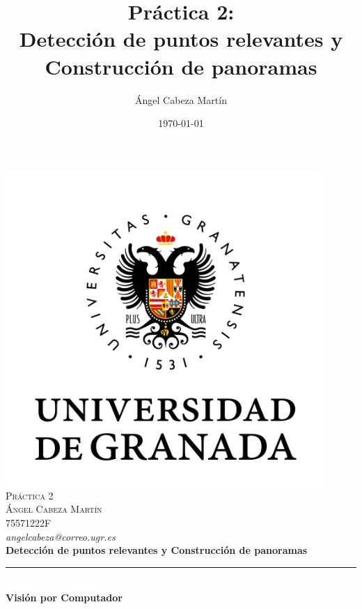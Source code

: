 \documentclass[12pt,spanish]{article}
\title{Práctica 2:\\
Detección de puntos relevantes y Construcción de panoramas  \hspace{0.05cm} }
\author{Ángel Cabeza Martín}
\date{\today}
\begin{document}
\begin{titlepage}
 
 
\newlength{\centeroffset}
\setlength{\centeroffset}{-0.5\oddsidemargin}
\addtolength{\centeroffset}{0.5\evensidemargin}
\thispagestyle{empty}

\noindent\hspace*{\centeroffset}

\centering
\includegraphics[width=0.9\textwidth]{./imagenes_memoria/ugr.png}\\[0.1cm]

\textsc{ \Large Práctica 2\\[0.1cm]}
\textsc{ \Large Ángel Cabeza Martín}\\
\textsc{ \Large 75571222F}\\
\textsl{ angelcabeza@correo.ugr.es}\\[0.3cm]
% 
{\Huge\bfseries Detección de puntos relevantes y Construcción de panoramas\\
}
\noindent\rule[-1ex]{\textwidth}{2pt}\\[3.5ex]
{\large\bfseries Visión por Computador}
\end{titlepage}


\tableofcontents
\pagebreak
\end{document}
